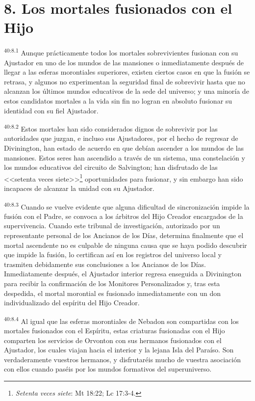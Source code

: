 \section*{8. Los mortales fusionados con el Hijo}
\par
\textsuperscript{40:8.1} Aunque prácticamente todos los mortales sobrevivientes fusionan con su Ajustador en uno de los mundos de las mansiones o inmediatamente después de llegar a las esferas morontiales superiores, existen ciertos casos en que la fusión se retrasa, y algunos no experimentan la seguridad final de sobrevivir hasta que no alcanzan los últimos mundos educativos de la sede del universo; y una minoría de estos candidatos mortales a la vida sin fin no logran en absoluto fusionar su identidad con su fiel Ajustador.

\par
\textsuperscript{40:8.2} Estos mortales han sido considerados dignos de sobrevivir por las autoridades que juzgan, e incluso sus Ajustadores, por el hecho de regresar de Divinington, han estado de acuerdo en que debían ascender a los mundos de las mansiones. Estos seres han ascendido a través de un sistema, una constelación y los mundos educativos del circuito de Salvington; han disfrutado de las <<setenta veces siete>>\footnote{\textit{Setenta veces siete}: Mt 18:22; Lc 17:3-4.} oportunidades para fusionar, y sin embargo han sido incapaces de alcanzar la unidad con su Ajustador.

\par
\textsuperscript{40:8.3} Cuando se vuelve evidente que alguna dificultad de sincronización impide la fusión con el Padre, se convoca a los árbitros del Hijo Creador encargados de la supervivencia. Cuando este tribunal de investigación, autorizado por un representante personal de los Ancianos de los Días, determina finalmente que el mortal ascendente no es culpable de ninguna causa que se haya podido descubrir que impide la fusión, lo certifican así en los registros del universo local y trasmiten debidamente sus conclusiones a los Ancianos de los Días. Inmediatamente después, el Ajustador interior regresa enseguida a Divinington para recibir la confirmación de los Monitores Personalizados y, tras esta despedida, el mortal morontial es fusionado inmediatamente con un don individualizado del espíritu del Hijo Creador.

\par
\textsuperscript{40:8.4} Al igual que las esferas morontiales de Nebadon son compartidas con los mortales fusionados con el Espíritu, estas criaturas fusionadas con el Hijo comparten los servicios de Orvonton con sus hermanos fusionados con el Ajustador, los cuales viajan hacia el interior y la lejana Isla del Paraíso. Son verdaderamente vuestros hermanos, y disfrutaréis mucho de vuestra asociación con ellos cuando paséis por los mundos formativos del superuniverso.

